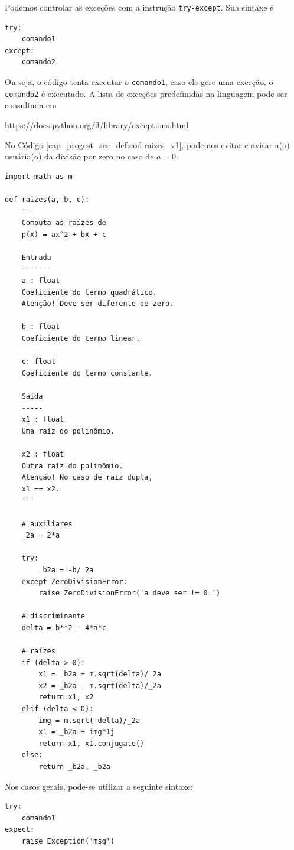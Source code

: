 Podemos controlar as exceções com a instrução \lstinline+try-except+. Sua sintaxe é
\begin{lstlisting}
try:
    comando1
except:
    comando2
\end{lstlisting}
Ou seja, o código tenta executar o \lstinline+comando1+, caso ele gere uma exceção, o \lstinline+comando2+ é executado. A lista de exceções predefinidas na linguagem pode ser consultada em
\begin{center}
  \url{https://docs.python.org/3/library/exceptions.html}
\end{center}

\begin{ex}
  No Código \ref{cap_progest_sec_def:cod:raizes_v1}, podemos evitar e avisar a(o) usuária(o) da divisão por zero no caso de $a=0$.
\begin{lstlisting}[caption=raizes\_v2.py]
import math as m

def raizes(a, b, c):
    '''
    Computa as raízes de
    p(x) = ax^2 + bx + c

    Entrada
    -------
    a : float
    Coeficiente do termo quadrático.
    Atenção! Deve ser diferente de zero.

    b : float 
    Coeficiente do termo linear.

    c: float
    Coeficiente do termo constante.

    Saída
    -----
    x1 : float
    Uma raíz do polinômio.

    x2 : float
    Outra raíz do polinômio.
    Atenção! No caso de raiz dupla,
    x1 == x2.
    '''

    # auxiliares
    _2a = 2*a

    try:
        _b2a = -b/_2a
    except ZeroDivisionError:
        raise ZeroDivisionError('a deve ser != 0.')

    # discriminante
    delta = b**2 - 4*a*c

    # raízes
    if (delta > 0):
        x1 = _b2a + m.sqrt(delta)/_2a
        x2 = _b2a - m.sqrt(delta)/_2a
        return x1, x2
    elif (delta < 0):
        img = m.sqrt(-delta)/_2a
        x1 = _b2a + img*1j
        return x1, x1.conjugate()
    else:
        return _b2a, _b2a
\end{lstlisting}
\end{ex}

\begin{obs}
  Nos casos gerais, pode-se utilizar a seguinte sintaxe:
\begin{lstlisting}
try:
    comando1
expect:
    raise Exception('msg')
\end{lstlisting}
\end{obs}

